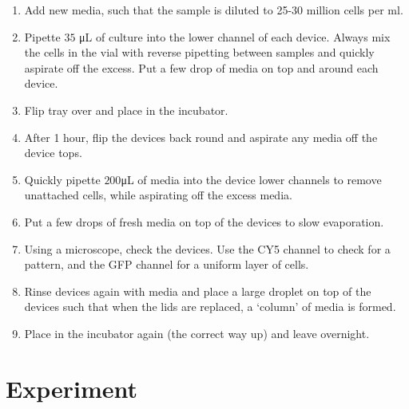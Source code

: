 \begin{enumerate}
	\item Add new media, such that the sample is diluted to 25-30 million cells per ml.
	\item Pipette $35$ \unit{\uL} of culture into the lower channel of each device. Always mix the cells in the vial with reverse pipetting between samples and quickly aspirate off the excess. Put a few drop of media on top and around each device.
	\item Flip tray over and place in the incubator.
	\item After 1 hour, flip the devices back round and aspirate any media off the device tops.
	\item Quickly pipette $200  $\unit{\uL} of media into the device lower channels to remove unattached cells, while aspirating off the excess media.
	\item Put a few drops of fresh media on top of the devices to slow evaporation.
	\item Using a microscope, check the devices. Use the CY5 channel to check for a pattern, and the GFP channel for a uniform layer of cells.
	\item Rinse devices again with media and place a large droplet on top of the devices such that when the lids are replaced, a `column' of media is formed.
	\item Place in the incubator again (the correct way up) and leave overnight.
\end{enumerate}

\section{Experiment}

